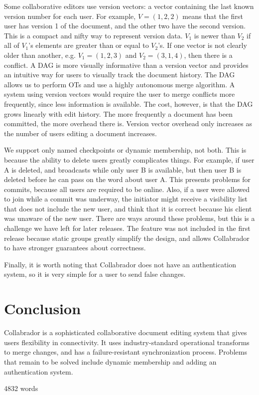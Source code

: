 \documentclass[11pt,titlepage]{article}
\begin{document}
Some collaborative editors use version vectors: a vector containing
the last known version number for each user. For example, \(V = (1, 2,
2)\) means that the first user has version 1 of the document, and the
other two have the second version.  This is a compact and nifty way to
represent version data. \(V_1\) is newer than \(V_2\) if all of
\(V_1\)'s elements are greater than or equal to \(V_2\)'s. If one
vector is not clearly older than another, e.g. \(V_1 = (1,2,3)\) and
\(V_2 = (3,1,4)\), then there is a conflict. A DAG is more visually
informative than a version vector and provides an intuitive way for
users to visually track the document history. The DAG allows us to
perform OTs and use a highly autonomous merge algorithm.  A system
using version vectors would require the user to merge conflicts more
frequently, since less information is available. The cost, however, is
that the DAG grows linearly with edit history. The more frequently a
document has been committed, the more overhead there is. Version
vector overhead only increases as the number of users editing a
document increases.

We support only named checkpoints or dynamic membership, not
both. This is because the ability to delete users greatly complicates
things. For example, if user A is deleted, and broadcasts while only
user B is available, but then user B is deleted before he can pass on
the word about user A. This presents problems for commits, because all
users are required to be online.  Also, if a user were allowed to join
while a commit was underway, the initiator might receive a visibility
list that does not include the new user, and think that it is correct
because his client was unaware of the new user.  There are ways around
these problems, but this is a challenge we have left for later
releases. The feature was not included in the first release because
static groups greatly simplify the design, and allows Collabrador to
have stronger guarantees about correctness.

Finally, it is worth noting that Collabrador does not have an
authentication system, so it is very simple for a user to send false
changes.

\section{Conclusion}

Collabrador is a sophisticated collaborative document editing system
that gives users flexibility in connectivity. It uses
industry-standard operational transforms to merge changes, and has a
failure-resistant synchronization process.  Problems that remain to be
solved include dynamic membership and adding an authentication system.

 

4832 words
\end{document}
